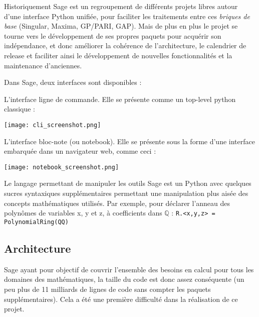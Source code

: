 \documentclass[12pt]{report}
\begin{document}
Historiquement Sage est un regroupement de différents projets libres autour
d'une interface Python unifiée, pour faciliter les traitements entre ces
\emph{briques de base} (Singular, Maxima, GP/PARI, GAP). Mais de plus en plus
le projet se tourne vers le développement de ses propres paquets pour
acquérir son indépendance, et donc améliorer la cohérence de l'architecture, le calendrier de release et faciliter ainsi le développement de nouvelles
fonctionnalités et la maintenance d'anciennes.


Dans Sage, deux interfaces sont disponibles :
\vspace{3mm}

\begin{itemize}
\noindent\begin{minipage}{\linewidth}
\item L'interface ligne de commande. Elle se présente comme un top-level
  python classique :
\vspace{3mm}
\begin{center}
\texttt{[image: cli\_screenshot.png]}
\end{center}
\end{minipage}
\noindent\begin{minipage}{\linewidth}
\item L'interface bloc-note (ou notebook). Elle se présente sous la forme
 d'une interface embarquée dans un navigateur web, comme ceci :
\vspace{3mm}
\begin{center}
\texttt{[image: notebook\_screenshot.png]}
\end{center}
\end{minipage}
\end{itemize}


\vspace{3mm}
Le langage permettant de manipuler les outils Sage est un Python avec quelques sucres
syntaxiques supplémentaires permettant une manipulation plus aisée des
concepts mathématiques utilisés. Par exemple, pour déclarer l'anneau des
polynômes de variables x, y et z, à coefficients dans $\mathbb{Q}$ :
\verb|R.<x,y,z> = PolynomialRing(QQ)|


\subsection{Architecture}
Sage ayant pour objectif de couvrir l'ensemble des besoins en calcul pour
tous les domaines des mathématiques, la taille du code est donc assez
conséquente (un peu plus de 11 milliards de lignes de code sans compter les
paquets supplémentaires). Cela a été une première difficulté dans la
réalisation de ce projet.
\end{document}
